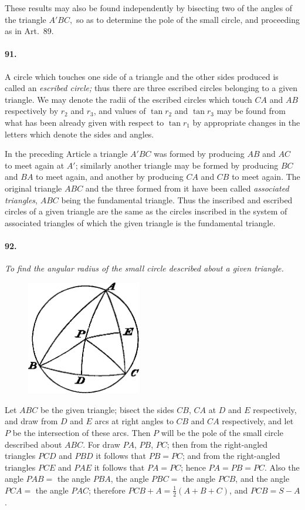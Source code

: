 \documentclass{book}[2004/02/16]
\begin{document}
\begin{mainmatter}
\begin{spacing}{1.3}
These results may also be found independently by bisecting
two of the angles of the triangle $A'BC,$ so as to determine the
pole of the small circle, and proceeding as in Art.~89.

\paragraph{91.} A circle which touches one side of a triangle and the
other sides produced is called an \textit{escribed circle;} thus there are
three escribed circles belonging to a given triangle. We may
denote the radii of the escribed circles which touch $CA$ and $AB$
respectively by $r_2$ and $r_3$, and values of $\tan r_2$ and $\tan r_3$ may
be found from what has been already given with respect to
$\tan r_1$ by appropriate changes in the letters which denote the
sides and angles.

In the preceding Article a triangle $A'BC$ was formed by producing
$AB$ and $AC$ to meet again at $A'$; similarly another triangle
may be formed by producing $BC$ and $BA$ to meet again, and
another by producing $CA$ and $CB$ to meet again. The original
triangle $ABC$ and the three formed from it have been called
\textit{associated triangles}, $ABC$ being the fundamental triangle. Thus
the inscribed and escribed circles of a given triangle are the same
as the circles inscribed in the system of associated triangles of
which the given triangle is the fundamental triangle.

\paragraph{92.} \textit{To find the angular radius of the small circle described
about a given triangle.}
\begin{figure}[htp]
\centering
\includegraphics[width=5.0cm]{images/072fc}
\end{figure}

Let $ABC$ be the given triangle; bisect the sides $CB$, $CA$ at
$D$ and $E$ respectively, and draw from $D$ and $E$ arcs at right angles
to $CB$ and $CA$ respectively, and let $P$ be the intersection of these
arcs. Then $P$ will be the pole of the small circle described about
$ABC$. For draw $PA$, $PB$, $PC$; then from the right-angled
triangles $PCD$ and $PBD$ it follows that $PB=PC$; and from
the right-angled triangles $PCE$ and $PAE$ it follows that $PA = PC$;
hence $PA = PB=PC$. Also the angle $PAB =$ the angle $PBA$,
the angle $PBC =$ the angle $PCB$, and the angle $PCA =$ the angle
$PAC$; therefore $PCB + A = \tfrac{1}{2} (A + B + C)$, and $PCB = S-A$.


\end{spacing}
\end{mainmatter}
\end{document}
